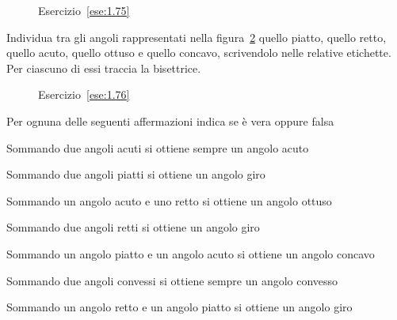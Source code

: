 \begin{inaccessibleblock}
 \begin{figure}[htb]
 \centering
 \caption{Esercizio~\ref{ese:1.75}}\label{fig:ese1.75}
\end{figure}
\end{inaccessibleblock}

\begin{esercizio}
\label{ese:1.76}
Individua tra gli angoli rappresentati nella figura~\ref{fig:ese1.76} 
quello piatto, quello retto, quello acuto, quello ottuso e quello 
concavo, scrivendolo nelle relative etichette. Per ciascuno di essi 
traccia la bisettrice.
\end{esercizio}


\begin{inaccessibleblock}
 \begin{figure}[htb]
 \centering
 \caption{Esercizio~\ref{ese:1.76}}\label{fig:ese1.76}
\end{figure}
\end{inaccessibleblock}

\begin{esercizio}
\label{ese:1.77}
Per ognuna delle seguenti affermazioni indica se è vera oppure falsa
\begin{enumeratea}
\item Sommando due angoli acuti si ottiene sempre un angolo 
acuto		\hfill\boxV\quad\boxF
\item Sommando due angoli piatti si ottiene un angolo giro	
			\hfill\boxV\quad\boxF
\item Sommando un angolo acuto e uno retto si ottiene un angolo 
ottuso	\hfill\boxV\quad\boxF
\item Sommando due angoli retti si ottiene un angolo giro	
			\hfill\boxV\quad\boxF
\item Sommando un angolo piatto e un angolo acuto si ottiene un 
angolo concavo	\hfill\boxV\quad\boxF
\item Sommando due angoli convessi si ottiene sempre un angolo 
convesso	\hfill\boxV\quad\boxF
\item Sommando un angolo retto e un angolo piatto si ottiene un 
angolo giro		\hfill\boxV\quad\boxF
\end{enumeratea}
\end{esercizio}

